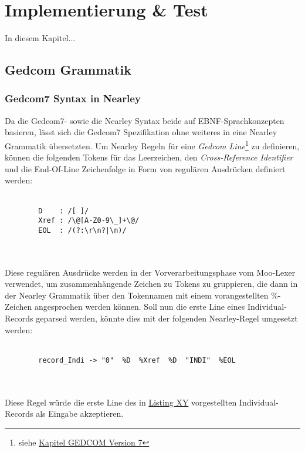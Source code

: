 \chapter{Implementierung \& Test}
\label{chap: Implementierung und Test}
In diesem Kapitel...

\section{Gedcom Grammatik}
\label{sec: Implementierung - Gedcom Grammatik}
\subsection{Gedcom7 Syntax in Nearley}
\label{subsec: Gedcom7 Syntax in Nearley}
Da die Gedcom7- sowie die Nearley Syntax beide auf EBNF-Sprachkonzepten basieren, lässt sich die Gedcom7 Spezifikation ohne weiteres in eine Nearley Grammatik übersetzten. Um Nearley Regeln für eine \textit{Gedcom Line}\footnote{siehe \hyperref[sec: GEDCOM Version 7]{Kapitel GEDCOM Version 7}} zu definieren, können die folgenden Tokens für das Leerzeichen, den \textit{Cross-Reference Identifier} und die End-Of-Line Zeichenfolge in Form von regulären Ausdrücken definiert werden:
\\ \\
\begin{minipage}{1.0\textwidth} \small
	\begin{lstlisting}
		D    : /[ ]/
		Xref : /\@[A-Z0-9\_]+\@/	
		EOL  : /(?:\r\n?|\n)/
	\end{lstlisting}
	\label{lst: tokens gedcom line}
\end{minipage}
\\ \\
Diese regulären Ausdrücke werden in der Vorverarbeitungsphase vom Moo-Lexer verwendet, um zusammenhängende Zeichen zu Tokens zu gruppieren, die dann in der Nearley Grammatik über den Tokennamen mit einem vorangestellten \%-Zeichen angesprochen werden können. Soll nun die erste Line eines Individual-Records geparsed werden, könnte dies mit der folgenden Nearley-Regel umgesetzt werden:
\\ \\
\begin{minipage}{1.0\textwidth} \small
	\begin{lstlisting}
		record_Indi -> "0"  %D  %Xref  %D  "INDI"  %EOL 
	\end{lstlisting}
	\label{lst: nearley regel individual record}
\end{minipage}
\\ \\
Diese Regel würde die erste Line des in \hyperref[lst: individual record example]{Listing XY} vorgestellten Individual-Records als Eingabe akzeptieren.


